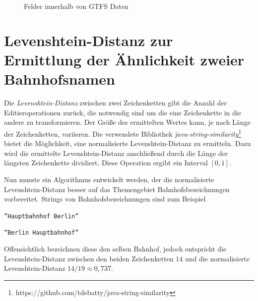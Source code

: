 \begin{figure}[H]
  \centering
   \caption{Felder innerhalb von GTFS Daten}
   \label{fig:gtfs_uml}
\end{figure}

\section{Levenshtein-Distanz zur Ermittlung der Ähnlichkeit zweier Bahnhofsnamen}
\label{sec:appendix:levenshtein}
Die \textit{Levenshtein-Distanz} zwischen zwei Zeichenketten gibt die Anzahl der Editieroperationen zurück, die notwendig sind um die eine Zeichenkette in die andere zu transformieren.
Der Größe des ermittelten Wertes kann, je nach Länge der Zeichenketten, variieren. 
Die verwendete Bibliothek \textit{java-string-similarity}\footnote{https://github.com/tdebatty/java-string-similarity} bietet die Möglichkeit, eine normalisierte Levenshtein-Distanz zu ermitteln. Dazu wird die ermittelte Levenshtein-Distanz anschließend durch die Länge der längsten Zeichenkette dividiert.
Diese Operation ergibt ein Interval $[0,1]$.

Nun musste ein Algorithmus entwickelt werden, der die normalisierte Levenshtein-Distanz besser auf das Themengebiet Bahnhofsbezeichnungen vorbereitet.
Strings von Bahnhofsbezeichnungen sind zum Beispiel 
\begin{compactitem}
  \item \texttt{''Hauptbahnhof Berlin''}
  \item \texttt{''Berlin Hauptbahnhof''}
\end{compactitem}
Offensichtlich bezeichnen diese den selben Bahnhof, jedoch entspricht die Levenshtein-Distanz zwischen den beiden Zeichenketten $14$ und die normalisierte Levenshtein-Distanz $14/19\approx0,737$.
 
